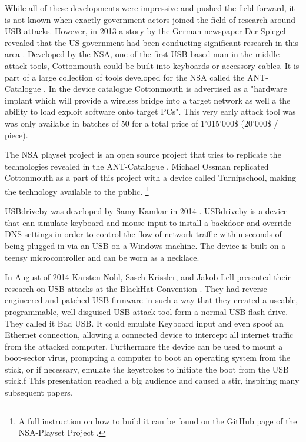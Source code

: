 While all of these developments were impressive and pushed the field forward, it is not known when exactly government actors joined the field of research around USB attacks. However, in 2013 a story by the German newspaper Der Spiegel revealed that the US government had been conducting significant research in this area \cite{appelbaumCatalogRevealsNSA2013}. Developed by the NSA, one of the first USB based man-in-the-middle attack tools, Cottonmouth could be built into keyboards or accessory cables. It is part of a large collection of tools developed for the NSA called the ANT-Catalogue \cite{InteractiveGraphicNSA}. In the device catalogue Cottonmouth is advertised as a "hardware implant which will provide a wireless bridge into a target network as well a the ability to load exploit software onto target PCs". This very early attack tool was was only available in batches of 50 for a total price of 1'015'000\$ (20'000\$ / piece).

The NSA playset project is an open source project that tries to replicate the technologies revealed in the ANT-Catalogue \cite{NSAPlaysetTurnipschoolHtml}. Michael Ossman replicated Cottonmouth as a part of this  project with a device called Turnipschool, making the technology available to the public. \footnote{A full instruction on how to build it can be found on the GitHub page of the NSA-Playset Project \cite{NSAPlaysetTurnipschoolHtml}.}

USBdriveby was developed by Samy Kamkar in 2014 \cite{SamyKamkarUSBdriveby}. USBdriveby is a device that can simulate keyboard and mouse input to install a backdoor and override DNS settings in order to control the flow of network traffic within seconds of being plugged in via an USB on a Windows machine. The device is built on a teensy microcontroller and can be worn as a necklace.

In August of 2014 Karsten Nohl, Sasch Krissler, and Jakob Lell presented their research on USB attacks at the BlackHat Convention \cite{Srlabsbadusbblackhatv1Pdf2014}. They had reverse engineered and patched USB firmware in such a way that they created a useable, programmable, well disguised USB attack tool form a normal USB flash drive. They called it Bad USB. It could emulate Keyboard input and even spoof an Ethernet connection, allowing a connected device to intercept all internet traffic from the attacked computer. Furthermore the device can be used to mount a boot-sector virus, prompting a computer to boot an operating system from the stick, or if necessary, emulate the keystrokes to initiate the boot from the USB stick.f This presentation reached a big audience and caused a stir, inspiring many subsequent papers.

